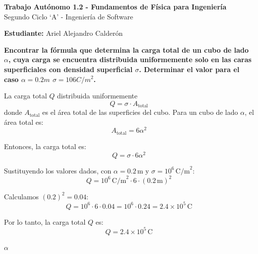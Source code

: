 \documentclass[answers]{exam} %
\begin{document}
\begin{center}
	\large\textbf{Trabajo Autónomo 1.2 - Fundamentos de Física para Ingeniería}\\[1em]
	\large Segundo Ciclo \enquote*{A} - Ingeniería de Software\\[1em]
\end{center}

\vspace{0.5cm}
\large\textbf{Estudiante:} Ariel Alejandro Calderón
\vspace{0.5cm}

\begin{questions}

	\question \large\textbf{Encontrar la fórmula que determina la carga total de un cubo de lado $\alpha$, cuya carga se encuentra distribuida uniformemente solo en las caras superficiales con densidad superficial $\sigma$. Determinar el valor para el caso $\alpha = 0.2 m$ $\sigma = 106C/m^2$.}

	\vspace{0.5cm}




	\begin{multicols}{2} %
		La carga total \( Q \) distribuida uniformemente
		\[
			Q = \sigma \cdot A_{\text{total}}
		\]
		donde \( A_{\text{total}} \) es el área total de las superficies del cubo. Para un cubo de lado \( \alpha \), el área total es:
		\[
			A_{\text{total}} = 6 \alpha^2
		\]

		Entonces, la carga total es:
		\[
			Q = \sigma \cdot 6 \alpha^2
		\]

		Sustituyendo los valores dados, con \( \alpha = 0.2 \, \text{m} \) y \( \sigma = 10^6 \, \text{C/m}^2 \):
		\[
			Q = 10^6 \, \text{C/m}^2 \cdot 6 \cdot (0.2 \, \text{m})^2
		\]

		Calculamos \( (0.2)^2 = 0.04 \):
		\[
			Q = 10^6 \cdot 6 \cdot 0.04 = 10^6 \cdot 0.24 = 2.4 \times 10^5 \, \text{C}
		\]

		Por lo tanto, la carga total \( Q \) es:
		\[
			Q = 2.4 \times 10^5 \, \text{C}
		\]
	\end{multicols}

	\begin{minipage}{\textwidth}
		\centering
		$\alpha$
	\end{minipage}


\end{questions}
\end{document}
